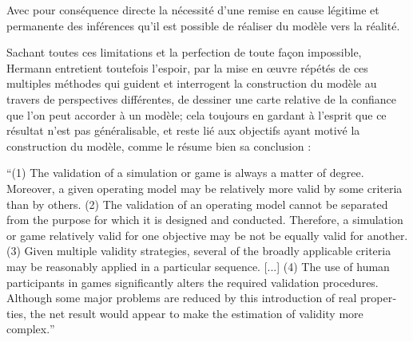 


Avec pour conséquence directe la nécessité d'une remise en cause légitime et permanente des inférences qu'il est possible de réaliser du modèle vers la réalité.



Sachant toutes ces limitations et la perfection de toute façon impossible, Hermann entretient toutefois l'espoir, par la mise en œuvre répétés de ces multiples méthodes qui guident et interrogent la construction du modèle au travers de perspectives différentes, de dessiner une carte relative de la confiance que l'on peut accorder à un modèle; cela toujours en gardant à l'esprit que ce résultat n'est pas généralisable, et reste lié aux objectifs ayant motivé la construction du modèle, comme le résume bien sa conclusion :

\foreignquote{english}{(1) The validation of a simulation or game is always a matter of degree. Moreover, a given operating model may be relatively more valid by some criteria than by others. (2) The validation of an operating model cannot be separated from the purpose for which it is designed and conducted. Therefore, a simulation or game relatively valid for one objective may be not be equally valid for another. (3) Given multiple validity strategies, several of the broadly applicable criteria may be reasonably applied in a particular sequence. [...] (4) The use of human participants in games significantly alters the required validation procedures. Although some major problems are reduced by this introduction of real properties, the net result would appear to make the estimation of validity more complex.} \textcite{Hermann1967}


